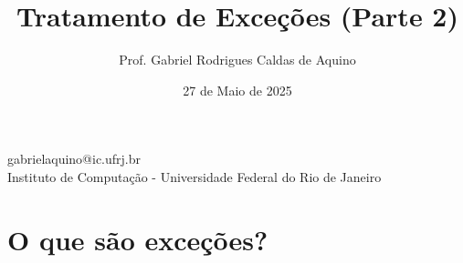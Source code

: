 
\title{Tratamento de Exceções (Parte 2)}

\author{Prof. Gabriel Rodrigues Caldas de Aquino}

\institute
{
    gabrielaquino@ic.ufrj.br\\
    
    Instituto de Computação -
    Universidade Federal do Rio de Janeiro %
}
\date{27 de Maio de 2025} %



\begin{frame}
    \titlepage
\end{frame}

\section{O que são exceções?}





